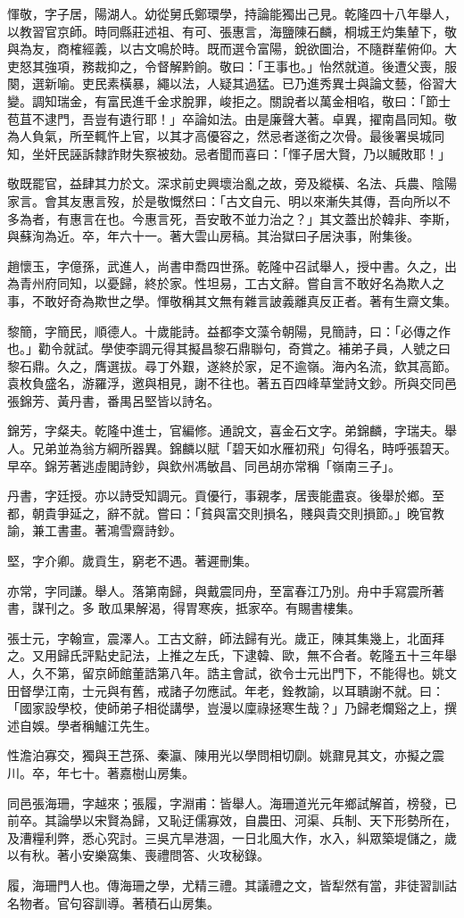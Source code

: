 \begin{pinyinscope}
惲敬，字子居，陽湖人。幼從舅氏鄭環學，持論能獨出己見。乾隆四十八年舉人，以教習官京師。時同縣莊述祖、有可、張惠言，海鹽陳石麟，桐城王灼集輦下，敬與為友，商榷經義，以古文鳴於時。既而選令富陽，銳欲圖治，不隨群輩俯仰。大吏怒其強項，務裁抑之，令督解黔餉。敬曰：「王事也。」怡然就道。後遭父喪，服闋，選新喻。吏民素橫暴，繩以法，人疑其過猛。已乃進秀異士與論文藝，俗習大變。調知瑞金，有富民進千金求脫罪，峻拒之。關說者以萬金相啗，敬曰：「節士苞苴不逮門，吾豈有遺行耶！」卒論如法。由是廉聲大著。卓異，擢南昌同知。敬為人負氣，所至輒忤上官，以其才高優容之，然忌者遂銜之次骨。最後署吳城同知，坐奸民誣訴隸詐財失察被劾。忌者聞而喜曰：「惲子居大賢，乃以贓敗耶！」

敬既罷官，益肆其力於文。深求前史興壞治亂之故，旁及縱橫、名法、兵農、陰陽家言。會其友惠言歿，於是敬慨然曰：「古文自元、明以來漸失其傳，吾向所以不多為者，有惠言在也。今惠言死，吾安敢不並力治之？」其文蓋出於韓非、李斯，與蘇洵為近。卒，年六十一。著大雲山房稿。其治獄曰子居決事，附集後。

趙懷玉，字億孫，武進人，尚書申喬四世孫。乾隆中召試舉人，授中書。久之，出為青州府同知，以憂歸，終於家。性坦易，工古文辭。嘗自言不敢好名為欺人之事，不敢好奇為欺世之學。惲敬稱其文無有雜言詖義離真反正者。著有生齋文集。

黎簡，字簡民，順德人。十歲能詩。益都李文藻令朝陽，見簡詩，曰：「必傳之作也。」勸令就試。學使李調元得其擬昌黎石鼎聯句，奇賞之。補弟子員，人號之曰黎石鼎。久之，膺選拔。尋丁外艱，遂終於家，足不逾嶺。海內名流，欽其高節。袁枚負盛名，游羅浮，邀與相見，謝不往也。著五百四峰草堂詩文鈔。所與交同邑張錦芳、黃丹書，番禺呂堅皆以詩名。

錦芳，字粲夫。乾隆中進士，官編修。通說文，喜金石文字。弟錦麟，字瑞夫。舉人。兄弟並為翁方綱所器異。錦麟以賦「碧天如水雁初飛」句得名，時呼張碧天。早卒。錦芳著逃虛閣詩鈔，與欽州馮敏昌、同邑胡亦常稱「嶺南三子」。

丹書，字廷授。亦以詩受知調元。貢優行，事親孝，居喪能盡哀。後舉於鄉。至都，朝貴爭延之，辭不就。嘗曰：「貧與富交則損名，賤與貴交則損節。」晚官教諭，兼工書畫。著鴻雪齋詩鈔。

堅，字介卿。歲貢生，窮老不遇。著遲刪集。

亦常，字同謙。舉人。落第南歸，與戴震同舟，至富春江乃別。舟中手寫震所著書，謀刊之。多敢瓜果解渴，得胃寒疾，抵家卒。有賜書樓集。

張士元，字翰宣，震澤人。工古文辭，師法歸有光。歲正，陳其集幾上，北面拜之。又用歸氏評點史記法，上推之左氏，下逮韓、歐，無不合者。乾隆五十三年舉人，久不第，留京師館董誥第八年。誥主會試，欲令士元出門下，不能得也。姚文田督學江南，士元與有舊，戒諸子勿應試。年老，銓教諭，以耳聵謝不就。曰：「國家設學校，使師弟子相從講學，豈漫以廩祿拯寒生哉？」乃歸老爛谿之上，撰述自娛。學者稱鱸江先生。

性澹泊寡交，獨與王芑孫、秦瀛、陳用光以學問相切劘。姚鼐見其文，亦擬之震川。卒，年七十。著嘉樹山房集。

同邑張海珊，字越來；張履，字淵甫：皆舉人。海珊道光元年鄉試解首，榜發，已前卒。其論學以宋賢為歸，又恥迂儒寡效，自農田、河渠、兵制、天下形勢所在，及漕糧利弊，悉心究討。三吳亢旱港涸，一日北風大作，水入，糾眾築堤儲之，歲以有秋。著小安樂窩集、喪禮問答、火攻秘錄。

履，海珊門人也。傳海珊之學，尤精三禮。其議禮之文，皆犁然有當，非徒習訓詁名物者。官句容訓導。著積石山房集。


\end{pinyinscope}